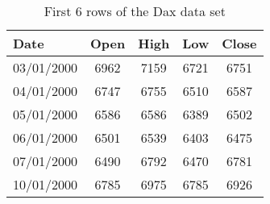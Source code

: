 \begin{table}[ht]
\centering
\caption[First 6 rows of the Dax data set.]{First 6 rows of the Dax data set} 
\label{tab:daxhead}
\begin{tabular}{lcccc}
  \toprule Date & Open & High & Low & Close \\ 
  \midrule 03/01/2000 & 6962 & 7159 & 6721 & 6751 \\ 
  04/01/2000 & 6747 & 6755 & 6510 & 6587 \\ 
  05/01/2000 & 6586 & 6586 & 6389 & 6502 \\ 
  06/01/2000 & 6501 & 6539 & 6403 & 6475 \\ 
  07/01/2000 & 6490 & 6792 & 6470 & 6781 \\ 
  10/01/2000 & 6785 & 6975 & 6785 & 6926 \\ 
   \bottomrule \end{tabular}
\end{table}
